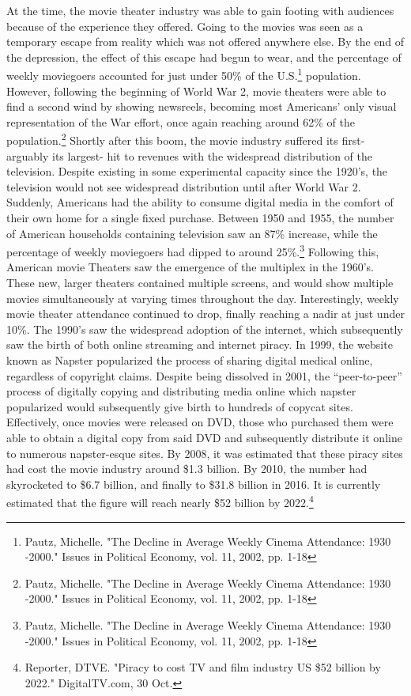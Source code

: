 \documentclass[12pt]{article}
\begin{document}
At the time, the movie theater industry was able to gain footing with audiences because of the experience they offered. Going to the movies was seen as a temporary escape from reality which was not offered anywhere else. By the end of the depression, the effect of this escape had begun to wear, and the percentage of weekly moviegoers accounted for just under 50\% of the U.S.\footnote{Pautz, Michelle. "The Decline in Average Weekly Cinema Attendance: 1930 -2000." Issues in Political
    Economy, vol. 11, 2002, pp. 1-18
} population. However, following the beginning of World War 2, movie theaters were able to find a second wind by showing newsreels, becoming most Americans’ only visual representation of the War effort, once again reaching around 62\% of the population.\footnote{Pautz, Michelle. "The Decline in Average Weekly Cinema Attendance: 1930 -2000." Issues in Political
    Economy, vol. 11, 2002, pp. 1-18
} Shortly after this boom, the movie industry suffered its first- arguably its largest-  hit to revenues with the widespread distribution of the television. Despite existing in some experimental capacity since the 1920’s, the television would not see widespread distribution until after World War 2. Suddenly, Americans had the ability to consume digital media in the comfort of their own home for a single fixed purchase. Between 1950 and 1955, the number of American households containing  television saw an 87\% increase, while the percentage of weekly moviegoers had dipped to around 25\%.\footnote{Pautz, Michelle. "The Decline in Average Weekly Cinema Attendance: 1930 -2000." Issues in Political
    Economy, vol. 11, 2002, pp. 1-18
} Following this, American movie Theaters saw the emergence of the multiplex in the 1960’s. These new, larger theaters contained multiple screens, and would show multiple movies simultaneously at varying times throughout the day. Interestingly, weekly movie theater attendance continued to drop, finally reaching a nadir at just under 10\%. The 1990’s saw the widespread adoption of the internet, which subsequently saw the birth of both online streaming and internet piracy. In 1999, the website known as Napster popularized the process of sharing digital medical online, regardless of copyright claims. Despite being dissolved in 2001, the “peer-to-peer” process of digitally copying and distributing media online which napster popularized would subsequently give birth to hundreds of copycat sites. Effectively, once movies were released on DVD, those who purchased them were able to obtain a digital copy from said DVD and subsequently distribute it online to numerous napster-esque sites. By 2008, it was estimated that these piracy sites had cost the movie industry around \$1.3 billion. By 2010, the number had skyrocketed to \$6.7 billion, and finally to \$31.8 billion in 2016. It is currently estimated that the figure will reach nearly \$52 billion by 2022.\footnote{Reporter, DTVE. "Piracy to cost TV and film industry US \$52 billion by 2022." DigitalTV.com, 30 Oct. 
}
\end{document}
